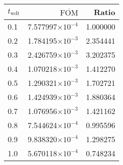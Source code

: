 \begin{tabular}{lrr}
\toprule
$t_{\mathrm{wdt}}$ & $\overline{\mathrm{FOM}}$ &    Ratio \\
\midrule
               0.1 &  7.577997$\times 10^{-4}$ & 1.000000 \\
               0.2 &  1.784195$\times 10^{-3}$ & 2.354441 \\
               0.3 &  2.426759$\times 10^{-3}$ & 3.202375 \\
               0.4 &  1.070218$\times 10^{-3}$ & 1.412270 \\
               0.5 &  1.290321$\times 10^{-3}$ & 1.702721 \\
               0.6 &  1.424939$\times 10^{-3}$ & 1.880364 \\
               0.7 &  1.076956$\times 10^{-3}$ & 1.421162 \\
               0.8 &  7.544624$\times 10^{-4}$ & 0.995596 \\
               0.9 &  9.838320$\times 10^{-4}$ & 1.298275 \\
               1.0 &  5.670118$\times 10^{-4}$ & 0.748234 \\
\bottomrule
\end{tabular}
